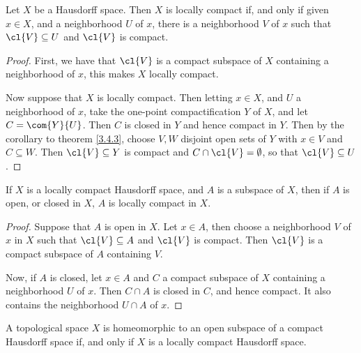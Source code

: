 \begin{theorem}\label{3.8.3}
    Let $X$ be a Hausdorff space. Then  $X$ is locally compact if, and only if
    given  $x \in X$, and a neighborhood  $U$ of  $x$, there is a neighborhood
    $V$ of  $x$ such that  $\cl{V} \subseteq U$ and $\cl{V}$ is compact.
\end{theorem}
\begin{proof}
    First, we have that $\cl{V}$ is a compact subspace of $X$ containing a
    neighborhood of $x$,  this makes $X$ locally compact.

    Now suppose that  $X$ is locally compact. Then letting  $x \in X$, and  $U$
    a neighborhood of  $x$, take the one-point compactification  $Y$ of  $X$,
    and let  $C=\com{Y}{U}$. Then $C$ is closed in  $Y$ and hence compact in
    $Y$. Then by the corollary to theorem \ref{3.4.3}, choose $V,W$ disjoint
    open sets of  $Y$ with  $x \in V$ and  $C \subseteq W$. Then  $\cl{V}
    \subseteq Y$ is compact and $C \cap \cl{V}=\emptyset$, so that $\cl{V}
    \subseteq U$.
\end{proof}
\begin{corollary}
    If $X$ is a locally compact Hausdorff space, and  $A$ is a subspace of  $X$,
    then if  $A$ is open, or closed in  $X$,  $A$ is locally compact in  $X$.
\end{corollary}
\begin{proof}
    Suppose that $A$ is open in  $X$. Let  $x \in A$, then choose a neighborhood
     $V$ of  $x$ in  $X$ such that  $\cl{V} \subseteq A$ and $\cl{V}$ is
     compact. Then $\cl{V}$ is a compact subspace of $A$ containing $V$.

     Now, if $A$ is closed, let  $x \in A$ and  $C$ a compact subspace of  $X$
     containing a neighborhood  $U$ of  $x$. Then $C \cap A$ is closed in  $C$,
     and hence compact. It also contains the neighborhood  $U \cap A$ of $x$.
\end{proof}
\begin{corollary}
    A topological space $X$ is homeomorphic to an open subspace of a compact
    Hausdorff space if, and only if  $X$ is a locally compact Hausdorff space.
\end{corollary}

